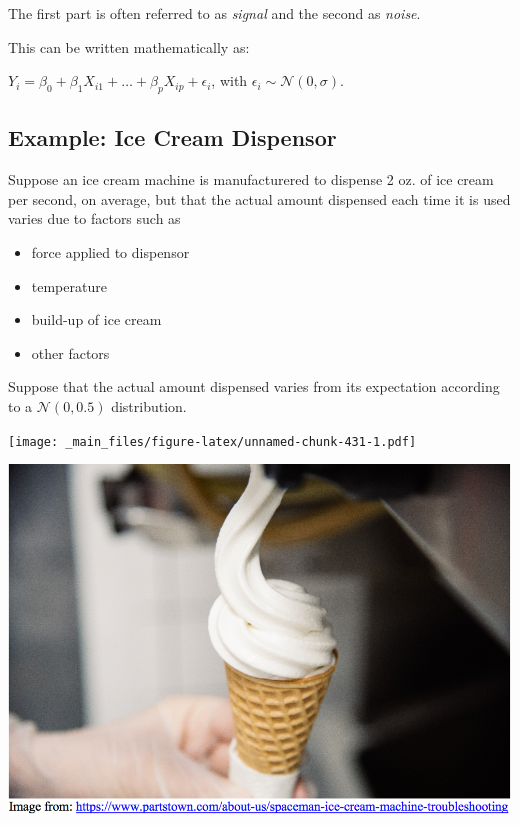\documentclass[]{book}
\providecommand{\tightlist}{%
  \setlength{\itemsep}{0pt}\setlength{\parskip}{0pt}}
\begin{document}
The first part is often referred to as \emph{signal} and the second as
\emph{noise}.

This can be written mathematically as:

\(Y_i = \beta_0 + \beta_1X_{i1}+ \ldots + \beta_pX_{ip} + \epsilon_i\),
with \(\epsilon_i\sim\mathcal{N}(0,\sigma)\).

\subsection{Example: Ice Cream
Dispensor}\label{example-ice-cream-dispensor}

Suppose an ice cream machine is manufacturered to dispense 2 oz. of ice
cream per second, on average, but that the actual amount dispensed each
time it is used varies due to factors such as

\begin{itemize}
\tightlist
\item
  force applied to dispensor\\
\item
  temperature\\
\item
  build-up of ice cream\\
\item
  other factors
\end{itemize}

Suppose that the actual amount dispensed varies from its expectation
according to a \(\mathcal{N}(0,0.5)\) distribution.

\texttt{[image: \_main\_files/figure-latex/unnamed-chunk-431-1.pdf]}

\includegraphics[width=1\linewidth]{Ice_Cream}
\end{document}
